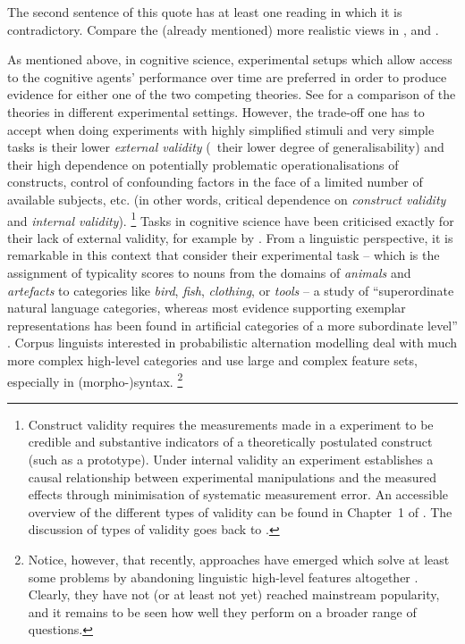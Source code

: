 The second sentence of this quote has at least one reading in which it is contradictory.
Compare the (already mentioned) more realistic views in \citet[84]{Barsalou1990}, \citet[486--487]{Dabrowska2016} and \citet[22]{Gries2003}.

As mentioned above, in cognitive science, experimental setups which allow access to the cognitive agents' performance over time are preferred in order to produce evidence for either one of the two competing theories.
See \citet{StormsEa2000} for a comparison of the theories in different experimental settings.
However, the trade-off one has to accept when doing experiments with highly simplified stimuli and very simple tasks is their lower \textit{external validity} (\ie\ their lower degree of generalisability) and their high dependence on potentially problematic operationalisations of constructs, control of confounding factors in the face of a limited number of available subjects, etc. (in other words, critical dependence on \textit{construct validity} and \textit{internal validity}).%
\footnote{Construct validity requires the measurements made in a experiment to be credible and substantive indicators of a theoretically postulated construct (such as a prototype).
Under internal validity an experiment establishes a causal relationship between experimental manipulations and the measured effects through minimisation of systematic measurement error.  
An accessible overview of the different types of validity can be found in Chapter~1 of \citet{MaxwellDelaney2004}.
The discussion of types of validity goes back to \citet{CronbachMeehl1955,CampbellFiske1959}.}
Tasks in cognitive science have been criticised exactly for their lack of external validity, for example by \citet{Murphy2003}.
From a linguistic perspective, it is remarkable in this context that \citet{VoorspoelsEa2011} consider their experimental task -- which is the assignment of typicality scores to nouns from the domains of \textit{animals} and \textit{artefacts} to categories like \textit{bird}, \textit{fish}, \textit{clothing}, or \textit{tools} -- a study of ``superordinate natural language categories, whereas most evidence supporting exemplar representations has been found in artificial categories of a more subordinate level'' \citep[1013]{VoorspoelsEa2011}.
Corpus linguists interested in probabilistic alternation modelling deal with much more complex high-level categories and use large and complex feature sets, especially in (morpho-)syntax.%
\footnote{Notice, however, that recently, approaches have emerged which solve at least some problems by abandoning linguistic high-level features altogether \citep{BaayenEa2016,RamscarPort2016}.
Clearly, they have not (or at least not yet) reached mainstream popularity, and it remains to be seen how well they perform on a broader range of questions.}
